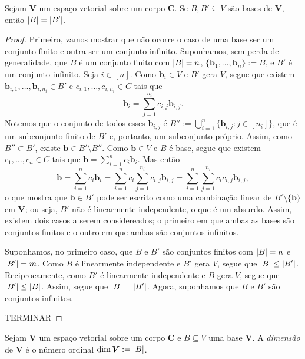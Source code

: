\begin{theorem}
	Sejam $\bm V$ um espaço vetorial sobre um corpo $\bm C$. Se $B,B' \subseteq V$ são bases de $\bm V$, então $\left\lvert{B}\right\rvert = \left\lvert{B'}\right\rvert$.
\end{theorem}
\begin{proof}
	Primeiro, vamos mostrar que não ocorre o caso de uma base ser um conjunto finito e outra ser um conjunto infinito. Suponhamos, sem perda de generalidade, que $B$ é um conjunto finito com $\left\lvert{B}\right\rvert=n$, $\{\bm b_1,\ldots,\bm b_n\} := B$, e $B'$ é um conjunto infinito. Seja $i \in [n]$. Como $\bm b_i \in V$ e $B'$ gera $V$, segue que existem $\bm b_{i,1}, \ldots, \bm b_{i,n_i} \in B'$ e $c_{i,1}, \ldots, c_{i,n_i} \in C$ tais que
	\begin{equation*}
	\bm b_i = \sum_{j=1}^{n_i} c_{i,j} \bm b_{i,j}.
	\end{equation*}
Notemos que o conjunto de todos esses $\bm b_{i,j}$ é $B'' := \bigcup_{i=1}^n \{\bm b_{i,j} : j \in [n_i]\}$, que é um subconjunto finito de $B'$ e, portanto, um subconjunto próprio. Assim, como $B'' \subset B'$, existe $\bm b \in B' \setminus B''$. Como $\bm b \in V$ e $B$ é base, segue que existem $c_1, \ldots, c_n \in C$ tais que $\bm b = \sum_{i=1}^n c_i \bm b_i$. Mas então
	\begin{equation*}
	\bm b = \sum_{i=1}^n c_i \bm b_i = \sum _{i=1}^n c_i \sum_{j=1}^{n_i} c_{i,j} \bm b_{i,j} = \sum _{i=1}^n \sum_{j=1}^{n_i} c_ic_{i,j} \bm b_{i,j},
	\end{equation*}
o que mostra que $\bm b \in B'$ pode ser escrito como uma combinação linear de $B' \setminus \{\bm b\}$ em $\bm V$; ou seja, $B'$ não é linearmente independente, o que é um absurdo. Assim, existem dois casos a serem considereados; o primeiro em que ambas as bases são conjuntos finitos e o outro em que ambas são conjuntos infinitos.

	Suponhamos, no primeiro caso, que $B$ e $B'$ são conjuntos finitos com $\left\lvert{B}\right\rvert=n$ e $\left\lvert{B'}\right\rvert=m$. Como $B$ é linearmente independente e $B'$ gera $V$, segue que $\left\lvert{B}\right\rvert \leq \left\lvert{B'}\right\rvert$. Reciprocamente, como $B'$ é linearmente independente e $B$ gera $V$, segue que $\left\lvert{B'}\right\rvert \leq \left\lvert{B}\right\rvert$. Assim, segue que $\left\lvert{B}\right\rvert = \left\lvert{B'}\right\rvert$. Agora, suponhamos que $B$ e $B'$ são conjuntos infinitos.

TERMINAR
\end{proof}

\begin{definition}
	Sejam $\bm V$ um espaço vetorial sobre um corpo $\bm C$ e $B \subseteq V$ uma base $\bm V$. A \emph{dimensão} de $\bm V$ é o número ordinal
	$\dim \bm V := \left\lvert{B}\right\rvert$.
\end{definition}

